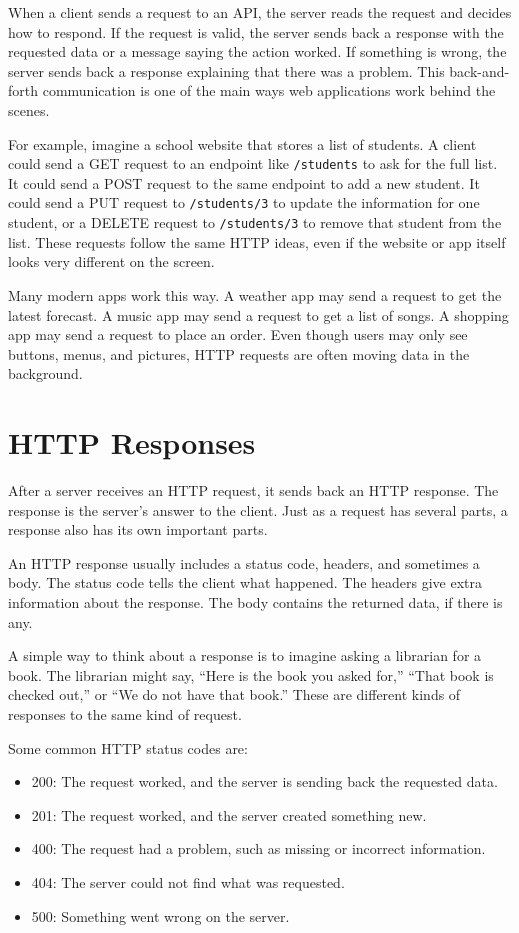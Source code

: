 When a client sends a request to an API, the server reads the request
and decides how to respond. If the request is valid, the server sends
back a response with the requested data or a message saying the action
worked. If something is wrong, the server sends back a response
explaining that there was a problem. This back-and-forth communication
is one of the main ways web applications work behind the scenes.

For example, imagine a school website that stores a list of students.
A client could send a GET request to an endpoint like \texttt{/students}
to ask for the full list. It could send a POST request to the same
endpoint to add a new student. It could send a PUT request to
\texttt{/students/3} to update the information for one student, or a
DELETE request to \texttt{/students/3} to remove that student from the
list. These requests follow the same HTTP ideas, even if the website
or app itself looks very different on the screen.

Many modern apps work this way. A weather app may send a request to
get the latest forecast. A music app may send a request to get a list
of songs. A shopping app may send a request to place an order. Even
though users may only see buttons, menus, and pictures, HTTP requests
are often moving data in the background.


\section{HTTP Responses}

After a server receives an HTTP request, it sends back an HTTP
response. The response is the server's answer to the client. Just as a
request has several parts, a response also has its own important
parts.

An HTTP response usually includes a status code, headers, and
sometimes a body. The status code tells the client what happened. The
headers give extra information about the response. The body contains
the returned data, if there is any.

A simple way to think about a response is to imagine asking a librarian
for a book. The librarian might say, ``Here is the book you asked
for,'' ``That book is checked out,'' or ``We do not have that
book.'' These are different kinds of responses to the same kind of
request.

Some common HTTP status codes are:

\begin{itemize}
    \item 200: The request worked, and the server is sending back the requested data.
    \item 201: The request worked, and the server created something new.
    \item 400: The request had a problem, such as missing or incorrect information.
    \item 404: The server could not find what was requested.
    \item 500: Something went wrong on the server.
\end{itemize}

